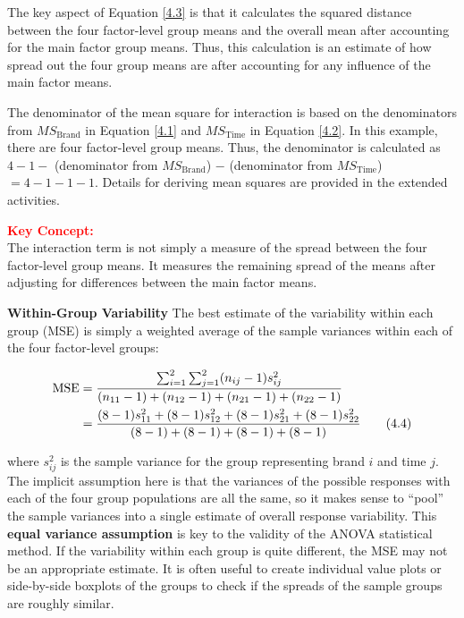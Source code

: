 \documentclass[
]{report}
\begin{document}
The key aspect of Equation \ref{4.3} is that it calculates the squared distance between the four factor-level group means and the overall mean after accounting for the main factor group means. Thus, this calculation is an estimate of how spread out the four group means are after accounting for any influence of the main factor means.

The denominator of the mean square for interaction is based on the denominators from \(MS_{\text{Brand}}\) in Equation \ref{4.1} and \(MS_{\text{Time}}\) in Equation \ref{4.2}. In this example, there are four factor-level group means. Thus, the denominator is calculated as \(4 - 1 -\) (denominator from \(MS_{\text{Brand}}\)) \(-\) (denominator from \(MS_{\text{Time}}\)) \(= 4 - 1 - 1 - 1\). Details for deriving mean squares are provided in the extended activities.

\large

\textbf{\textcolor{red}{Key Concept:}}\\
\color{red}
The interaction term is not simply a measure of the spread between the four factor-level group means. It measures the remaining spread of the means after adjusting for differences between the main factor means.
\color{black}
\normalsize

\textbf{Within-Group Variability} The best estimate of the variability within each group (MSE) is simply a weighted average of the sample variances within each of the four factor-level groups:

\begin{align}
\text{MSE} &= 
\frac{\sum_{i=1}^{2}\sum_{j=1}^{2}(n_{ij} - 1)s_{ij}^2}{(n_{11} - 1) + (n_{12} - 1) + (n_{21} - 1) + (n_{22} - 1)} \notag \\
&= \frac{(8 - 1)s_{11}^2 + (8 - 1)s_{12}^2 + (8 - 1)s_{21}^2 + (8 - 1)s_{22}^2}
{(8 - 1) + (8 - 1) + (8 - 1) + (8 - 1)}
\tag{4.4}\label{4.4}
\end{align}

where \(s_{ij}^2\) is the sample variance for the group representing brand \(i\) and time \(j\). The implicit assumption here is that the variances of the possible responses with each of the four group populations are all the same, so it makes sense to ``pool'' the sample variances into a single estimate of overall response variability. This \textbf{equal variance assumption} is key to the validity of the ANOVA statistical method. If the variability within each group is quite different, the MSE may not be an appropriate estimate. It is often useful to create individual value plots or side-by-side boxplots of the groups to check if the spreads of the sample groups are roughly similar.
\end{document}
